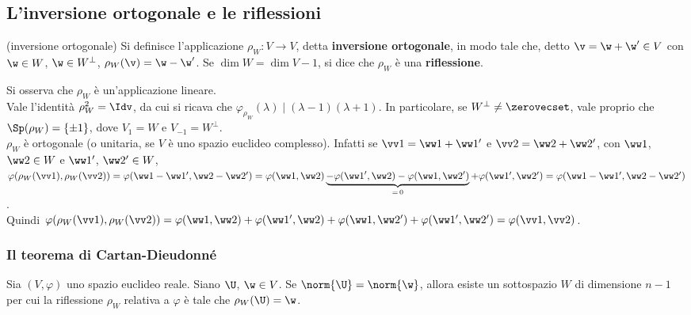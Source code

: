 \subsection{L'inversione ortogonale e le riflessioni}

\begin{definition} (inversione ortogonale)
	Si definisce l'applicazione $\rho_W : V \to V$, detta \textbf{inversione ortogonale}, in modo tale che, detto $\v = \w + \w' \in V$ con $\w \in W$, $\w \in W^\perp$, $\rho_W(\v) = \w - \w'$. Se $\dim W = \dim V - 1$,
	si dice che $\rho_W$ è una \textbf{riflessione}.
\end{definition}

\begin{remark}\nl
	\li Si osserva che $\rho_W$ è un'applicazione lineare. \\
	\li Vale l'identità $\rho_W^2 = \Idv$, da cui si ricava che $\varphi_{\rho_W}(\lambda) \mid (\lambda-1)(\lambda+1)$. In particolare, se $W^\perp \neq \zerovecset$, vale proprio
	che $\Sp(\rho_W) = \{\pm1\}$, dove $V_1 = W$ e $V_{-1} = W^\perp$. \\
	\li $\rho_W$ è ortogonale (o unitaria, se $V$ è uno spazio euclideo complesso). Infatti se $\vv 1 = \ww 1 + \ww 1'$ e $\vv 2 = \ww 2 + \ww 2 '$, con $\ww 1$, $\ww 2 \in W$ e $\ww 1'$, $\ww 2' \in W$, $\varphi(\rho_W(\vv 1), \rho_W(\vv 2)) = \varphi(\ww 1 - \ww 1', \ww 2 - \ww 2') = \varphi(\ww 1, \ww 2) \underbrace{- \varphi(\ww 1', \ww 2) - \varphi(\ww 1, \ww 2')}_{=\,0} + \varphi(\ww 1', \ww 2') =  \varphi(\ww 1 - \ww 1', \ww 2 - \ww 2')$. \\
	
	Quindi $\varphi(\rho_W(\vv 1), \rho_W(\vv 2)) = \varphi(\ww 1, \ww 2) + \varphi(\ww 1', \ww 2) + \varphi(\ww 1, \ww 2') + \varphi(\ww 1', \ww 2') = \varphi(\vv 1, \vv 2)$.
\end{remark}

\subsubsection{Il teorema di Cartan-Dieudonné}

\begin{lemma} Sia $(V, \varphi)$ uno spazio euclideo reale.
	Siano $\U$, $\w \in V$. Se $\norm{\U} = \norm{\w}$, allora esiste un sottospazio $W$ di dimensione
	$n-1$ per cui la riflessione $\rho_W$ relativa a $\varphi$ è tale che $\rho_W(\U) = \w$.
\end{lemma}

